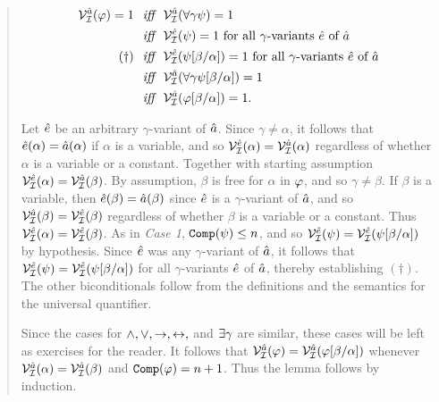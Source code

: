 \begin{quote}
  \vspace{-.2in}
  \begin{align*}
    \mathcal{V}_{\mathcal{I}}^{\hat{a}}(\varphi)=1 
      &\textit{ ~iff~ } \mathcal{V}_{\mathcal{I}}^{\hat{a}}(\forall \gamma\psi)=1\\
      &\textit{ ~iff~ } \mathcal{V}_{\mathcal{I}}^{\hat{e}}(\psi)=1 \text{ for all } \gamma\text{-variants } \hat{e} \text{ of } \hat{a}\\ 
      (\dagger) &\textit{ ~iff~ } \mathcal{V}_{\mathcal{I}}^{\hat{e}}(\psi[\beta/\alpha])=1 \text{ for all } \gamma\text{-variants } \hat{e} \text{ of } \hat{a}\\  
      &\textit{ ~iff~ } \mathcal{V}_{\mathcal{I}}^{\hat{a}}(\forall \gamma\psi[\beta/\alpha])=1\\ 
      &\textit{ ~iff~ } \mathcal{V}_{\mathcal{I}}^{\hat{a}}(\varphi[\beta/\alpha])=1.
  \end{align*}

  Let $\hat{e}$ be an arbitrary $\gamma$-variant of $\hat{a}$.
  Since $\gamma\neq\alpha$, it follows that $\hat{e}(\alpha)=\hat{a}(\alpha)$ if $\alpha$ is a variable, and so $\mathcal{V}_{\mathcal{I}}^{\hat{e}}(\alpha)=\mathcal{V}_{\mathcal{I}}^{\hat{a}}(\alpha)$ regardless of whether $\alpha$ is a variable or a constant.
  Together with starting assumption $\mathcal{V}_{\mathcal{I}}^{\hat{e}}(\alpha)=\mathcal{V}_{\mathcal{I}}^{\hat{a}}(\beta)$.
  By assumption, $\beta$ is free for $\alpha$ in $\varphi$, and so $\gamma\neq\beta$.
  If $\beta$ is a variable, then $\hat{e}(\beta)=\hat{a}(\beta)$ since $\hat{e}$ is a $\gamma$-variant of $\hat{a}$, and so $\mathcal{V}_{\mathcal{I}}^{\hat{a}}(\beta)=\mathcal{V}_{\mathcal{I}}^{\hat{e}}(\beta)$ regardless of whether $\beta$ is a variable or a constant.
  Thus $\mathcal{V}_{\mathcal{I}}^{\hat{e}}(\alpha)=\mathcal{V}_{\mathcal{I}}^{\hat{e}}(\beta)$.
  As in \textit{Case 1}, $\texttt{Comp}(\psi)\leq n$, and so $\mathcal{V}_{\mathcal{I}}^{\hat{e}}(\psi)=\mathcal{V}_{\mathcal{I}}^{\hat{e}}(\psi[\beta/\alpha])$ by hypothesis.
  Since $\hat{e}$ was any $\gamma$-variant of $\hat{a}$, it follows that $\mathcal{V}_{\mathcal{I}}^{\hat{e}}(\psi)=\mathcal{V}_{\mathcal{I}}^{\hat{e}}(\psi[\beta/\alpha])$ for all $\gamma$-variants $\hat{e}$ of $\hat{a}$, thereby establishing $(\dagger)$.
  The other biconditionals follow from the definitions and the semantics for the universal quantifier.

  Since the cases for $\wedge,\vee,\rightarrow,\leftrightarrow,$ and $\exists \gamma$ are similar, these cases will be left as exercises for the reader.
  It follows that $\mathcal{V}_{\mathcal{I}}^{\hat{a}}(\varphi)=\mathcal{V}_{\mathcal{I}}^{\hat{a}}(\varphi[\beta/\alpha])$ whenever $\mathcal{V}_{\mathcal{I}}^{\hat{a}}(\alpha)=\mathcal{V}_{\mathcal{I}}^{\hat{a}}(\beta)$ and $\texttt{Comp}(\varphi)=n+1$.
  Thus the lemma follows by induction.
\end{quote}


